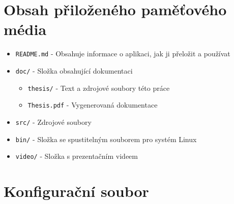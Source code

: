 





\chapter{Obsah přiloženého paměťového média}

\begin{itemize}  
\item \texttt{README.md} - Obsahuje informace o aplikaci, jak ji přeložit a používat
\item \texttt{doc/} - Složka obsahující dokumentaci
\begin{itemize}
\item \texttt{thesis/} - Text a zdrojové soubory této práce
\item \texttt{Thesis.pdf} - Vygenerovaná dokumentace 
\end{itemize}
\item \texttt{src/} - Zdrojové soubory
\item \texttt{bin/} - Složka se spustitelným souborem pro systém Linux
\item \texttt{video/} - Složka s prezentačním videem
\end{itemize}

\chapter{Konfigurační soubor}
\label{appendix:configfile}

